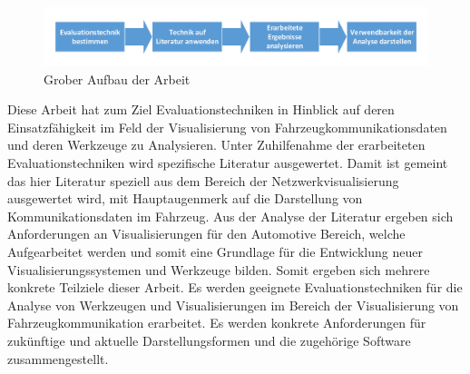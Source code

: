 \documentclass[draft=false
              ,paper=a4
              ,twoside=false
              ,fontsize=11pt
              ,headsepline
              ,BCOR10mm
              ,DIV11
              ]{scrbook}
\newcommand{\TODO}[1]{\colorbox{yellow}{\textcolor{red}{[TODO: #1]}}}
\begin{document}
\begin{figure}[htbp]
  \centering
  \includegraphics[width=\textwidth]{img/Aufbau_grob.pdf}
  \caption{Grober Aufbau der Arbeit}
  \label{fig:aufbaugrob}
\end{figure}

Diese Arbeit hat zum Ziel Evaluationstechniken in Hinblick auf deren Einsatzfähigkeit im Feld der Visualisierung von Fahrzeugkommunikationsdaten und deren Werkzeuge zu Analysieren. Unter Zuhilfenahme der erarbeiteten Evaluationstechniken wird spezifische Literatur ausgewertet. Damit ist gemeint das hier Literatur speziell aus dem Bereich der Netzwerkvisualisierung ausgewertet wird, mit Hauptaugenmerk auf die Darstellung von Kommunikationsdaten im Fahrzeug. Aus der Analyse der Literatur ergeben sich Anforderungen an Visualisierungen für den Automotive Bereich, welche Aufgearbeitet werden und somit eine Grundlage für die Entwicklung neuer Visualisierungssystemen und Werkzeuge bilden. 
Somit ergeben sich mehrere konkrete Teilziele dieser Arbeit. Es werden geeignete Evaluationstechniken für die Analyse von Werkzeugen und Visualisierungen im Bereich der Visualisierung von Fahrzeugkommunikation erarbeitet. Es werden konkrete Anforderungen für zukünftige und aktuelle Darstellungsformen und die zugehörige Software zusammengestellt.

\end{document}
